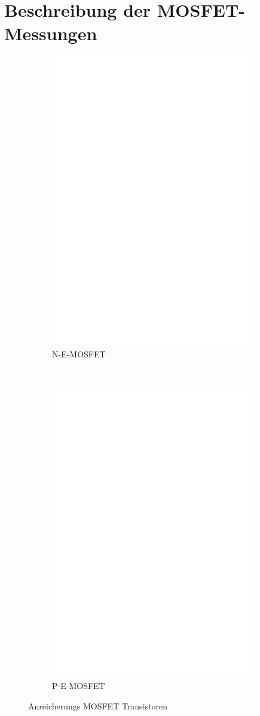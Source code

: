 \chapter{Beschreibung der MOSFET-Messungen}
\label{sec:MOSmeasurements}

\begin{figure}[H]
  \begin{subfigure}[b]{9cm}
    \centering
    \includegraphics[width=9cm]{../FIG/MOS_BUZ71.eps}
    \caption{N-E-MOSFET}
    \label{fig:MOS-N-E}
  \end{subfigure}
  ~
  \begin{subfigure}[b]{9cm}
    \centering
    \includegraphics[width=9cm]{../FIG/MOS_IRF5305.eps}
    \caption{P-E-MOSFET}
    \label{fig:MOS-P-E}
  \end{subfigure}
  \caption{Anreicherungs MOSFET Transistoren}
\end{figure}



